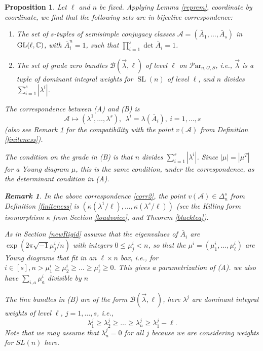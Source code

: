 \documentclass[11pt]{amsart}
\newcommand\op{\operatorname}
\newcommand\Par{\mathcal{P}\text{ar} }
\newtheorem{remark}[theorem]{ Remark}
\newtheorem{proposition}[theorem]{Proposition}
\numberwithin{theorem}{subsection}
\begin{document}
{\begin{proposition}
Let $\ell$ and $n$ be fixed. Applying Lemma \ref{reprem}, coordinate by coordinate, we find that the following sets are in bijective correspondence:
\begin{enumerate}
\item[(A)]The set of $s$-tuples of semisimple  conjugacy classes $\mathcal{A}=(\bar{A}_1,\dots,\bar{A}_s)$ in $\op{GL}(\ell,\Bbb{C})$, with $\bar{A}_i^n=1$, such that  $\prod_{i=1}^s \det \bar{A}_i =1$.
\item[(B)] The set of grade zero bundles $\mathcal{B}(\vec{\lambda},\ell)$  of level $\ell$ on $\Par_{n,\mathcal{O},S}$, i.e., $\vec{\lambda}$ is a tuple of  dominant integral weights  for $\op{SL}(n)$ of level $\ell$, and  $n$ divides $\sum_{i=1}^s|\lambda^i|$.
\end{enumerate}
The correspondence between (A) and (B) is 
\begin{equation}\label{corr2}
\mathcal{A}\mapsto (\lambda^1,\dots,\lambda^s),\ \ \lambda^i=\lambda(\bar{A}_i), \ i=1,\dots,s
\end{equation}
(also see Remark \ref{newRem} for the compatibility with the point $v(\mathcal{A})$ from Definition \ref{finiteness}). 

The condition on  the grade in  (B) is that $n$ divides $\sum_{i=1}^s|\lambda^i|$. Since $|\mu|=|\mu^T|$ for a Young diagram $\mu$, this is the same condition, under the correspondence, as the determinant condition in (A).
\begin{remark}\label{newRem}
In the above correspondence \eqref{corr2}, the point $v(\mathcal{A})\in \Delta_n^s$ from Definition \ref{finiteness} is
$(\kappa(\lambda^1/\ell),\dots,\kappa(\lambda^s/\ell))$ (see the Killing form isomorphism $\kappa$ from Section \ref{loudvoice}, and Theorem \ref{blacktea}).

\end{remark}

\iffalse
As in Section \ref{newRigid} assume  that the  eigenvalues of $\bar{A}_i$ are $\exp(2\pi\sqrt{-1}\mu_j^i/n)$ with integers $0\leq \mu_j^i<n$, so that the $\mu^i=(\mu^i_1,\dots,\mu^i_{\ell})$ are Young diagrams that fit in an $\ell\times n$ box, i.e.,  for $i\in [s], n> \mu^i_1\geq \mu^i_2\geq \dots \geq \mu^i_{\ell}\geq 0$. This gives a parametrization of (A). we also have $\sum_{i,a}\mu^i_a$ divisible by $n$

The line bundles in (B) are of the form $\mathcal{B}(\vec{\lambda},\ell)$, here $\lambda^j$ are dominant integral weights  of level $\ell$, $j=1,\dots,s$, i.e.,
\begin{equation}\label{weyl}
\lambda^{j}_1\geq \lambda^{j}_2\geq \dots\geq \lambda^{j}_n\geq \lambda^{j}_1-\ell.
\end{equation}
Note that we may assume that $\lambda^j_n=0$ for all $j$ because we are considering weights for $SL(n)$ here.


\end{proposition}}
\end{document}

